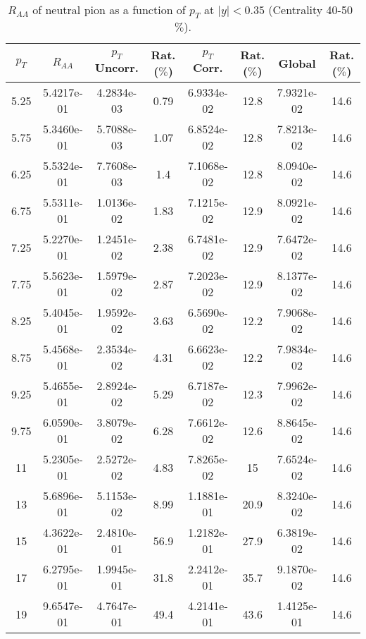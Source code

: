             
\begin{table}[!htb]
\centering
\begin{tabular}{|c|c|c|c|c|c|c|c|}
\hline
$p_{T}$ & $R_{AA}$ & $p_{T}$ Uncorr. & Rat. ($\%$) & $p_{T}$ Corr. & Rat. ($\%$) & Global & Rat. ($\%$)\\
\hline
5.25 & 5.4217e-01 & 4.2834e-03 & 0.79 & 6.9334e-02 & 12.8 & 7.9321e-02 & 14.6 \\ 
5.75 & 5.3460e-01 & 5.7088e-03 & 1.07 & 6.8524e-02 & 12.8 & 7.8213e-02 & 14.6 \\ 
6.25 & 5.5324e-01 & 7.7608e-03 & 1.4 & 7.1068e-02 & 12.8 & 8.0940e-02 & 14.6 \\ 
6.75 & 5.5311e-01 & 1.0136e-02 & 1.83 & 7.1215e-02 & 12.9 & 8.0921e-02 & 14.6 \\ 
7.25 & 5.2270e-01 & 1.2451e-02 & 2.38 & 6.7481e-02 & 12.9 & 7.6472e-02 & 14.6 \\ 
7.75 & 5.5623e-01 & 1.5979e-02 & 2.87 & 7.2023e-02 & 12.9 & 8.1377e-02 & 14.6 \\ 
8.25 & 5.4045e-01 & 1.9592e-02 & 3.63 & 6.5690e-02 & 12.2 & 7.9068e-02 & 14.6 \\ 
8.75 & 5.4568e-01 & 2.3534e-02 & 4.31 & 6.6623e-02 & 12.2 & 7.9834e-02 & 14.6 \\ 
9.25 & 5.4655e-01 & 2.8924e-02 & 5.29 & 6.7187e-02 & 12.3 & 7.9962e-02 & 14.6 \\ 
9.75 & 6.0590e-01 & 3.8079e-02 & 6.28 & 7.6612e-02 & 12.6 & 8.8645e-02 & 14.6 \\ 
11 & 5.2305e-01 & 2.5272e-02 & 4.83 & 7.8265e-02 & 15 & 7.6524e-02 & 14.6 \\ 
13 & 5.6896e-01 & 5.1153e-02 & 8.99 & 1.1881e-01 & 20.9 & 8.3240e-02 & 14.6 \\ 
15 & 4.3622e-01 & 2.4810e-01 & 56.9 & 1.2182e-01 & 27.9 & 6.3819e-02 & 14.6 \\ 
17 & 6.2795e-01 & 1.9945e-01 & 31.8 & 2.2412e-01 & 35.7 & 9.1870e-02 & 14.6 \\ 
19 & 9.6547e-01 & 4.7647e-01 & 49.4 & 4.2141e-01 & 43.6 & 1.4125e-01 & 14.6 \\ 
\hline
\end{tabular}
\caption{$R_{AA}$ of neutral pion as a function of $p_{T}$ at $|y|<0.35$ (Centrality 40-50~$\%$).}
\end{table}
            
